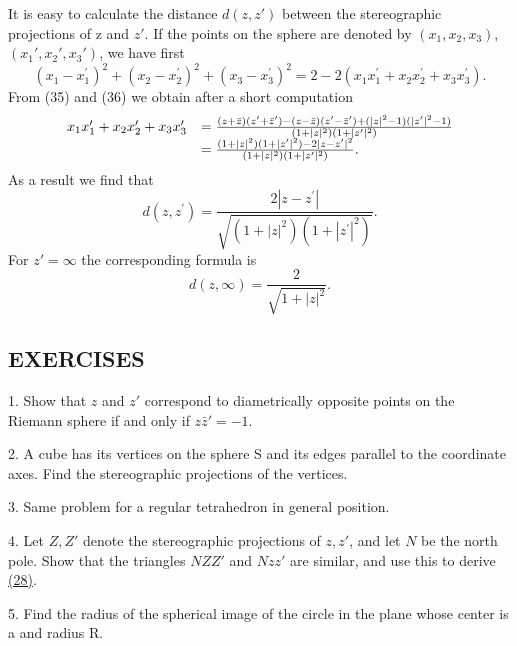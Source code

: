 It is easy to calculate the distance $d(z,z')$ between the stereographic projections of z and $z'$. If the points on the sphere are denoted by $(x_{1},x_{2},x_{3})$, $(x_{1}',x_{2}',x_{3}')$, we have first
\begin{equation*}
(x _ {1} - x _ {1} ^ {\prime}) ^ {2} + (x _ {2} - x _ {2} ^ {\prime}) ^ {2} + (x _ {3} - x _ {3} ^ {\prime}) ^ {2} = 2 - 2 \left(x _ {1} x _ {1} ^ {\prime} + x _ {2} x _ {2} ^ {\prime} + x _ {3} x _ {3} ^ {\prime}\right).
\end{equation*}
From (35) and (36) we obtain after a short computation
\begin{equation*}
\begin{array}{r l} x _ {1} x _ {1} ^ {\prime} + x _ {2} x _ {2} ^ {\prime} + x _ {3} x _ {3} ^ {\prime} & = \frac {(z + \bar {z}) (z ^ {\prime} + \bar {z} ^ {\prime}) - (z - \bar {z}) (z ^ {\prime} - \bar {z} ^ {\prime}) + (| z | ^ {2} - 1) (| z ^ {\prime} | ^ {2} - 1)}{(1 + | z | ^ {2}) (1 + | z ^ {\prime} | ^ {2})} \\ & = \frac {(1 + | z | ^ {2}) (1 + | z ^ {\prime} | ^ {2}) - 2 | z - z ^ {\prime} | ^ {2}}{(1 + | z | ^ {2}) (1 + | z ^ {\prime} | ^ {2})}. \end{array}
\end{equation*}
As a result we find that
\begin{equation*}
d (z, z ^ {\prime}) = \frac {2 | z - z ^ {\prime} |}{\sqrt {(1 + | z | ^ {2}) (1 + | z ^ {\prime} | ^ {2})}}.\tag{28}\label{eq:1.28}
\end{equation*}
For $z' = \infty$ the corresponding formula is
\begin{equation*}
d (z, \infty) = \frac {2}{\sqrt {1 + | z | ^ {2}}}.
\end{equation*}
\subsection*{EXERCISES}
1. Show that $z$ and $z'$ correspond to diametrically opposite points on the Riemann sphere if and only if $z\bar{z}' = -1$.

2. A cube has its vertices on the sphere S and its edges parallel to the coordinate axes. Find the stereographic projections of the vertices.

3. Same problem for a regular tetrahedron in general position.

4. Let $Z, Z'$ denote the stereographic projections of $z, z'$, and let $N$ be the north pole. Show that the triangles $NZZ'$ and $Nzz'$ are similar, and use this to derive \hyperref[eq:1.28]{(28)}.

5. Find the radius of the spherical image of the circle in the plane whose center is a and radius R.

